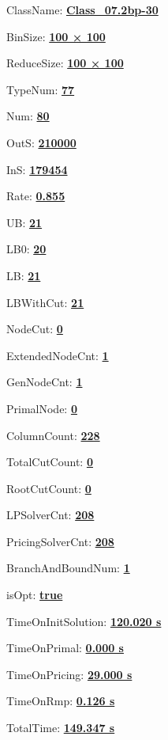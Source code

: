 \documentclass[11pt]{article}
\begin{document}
\pagestyle{empty}


ClassName: \underline{\textbf{Class_07.2bp-30}}
\par
BinSize: \underline{\textbf{100 × 100}}
\par
ReduceSize: \underline{\textbf{100 × 100}}
\par
TypeNum: \underline{\textbf{77}}
\par
Num: \underline{\textbf{80}}
\par
OutS: \underline{\textbf{210000}}
\par
InS: \underline{\textbf{179454}}
\par
Rate: \underline{\textbf{0.855}}
\par
UB: \underline{\textbf{21}}
\par
LB0: \underline{\textbf{20}}
\par
LB: \underline{\textbf{21}}
\par
LBWithCut: \underline{\textbf{21}}
\par
NodeCut: \underline{\textbf{0}}
\par
ExtendedNodeCnt: \underline{\textbf{1}}
\par
GenNodeCnt: \underline{\textbf{1}}
\par
PrimalNode: \underline{\textbf{0}}
\par
ColumnCount: \underline{\textbf{228}}
\par
TotalCutCount: \underline{\textbf{0}}
\par
RootCutCount: \underline{\textbf{0}}
\par
LPSolverCnt: \underline{\textbf{208}}
\par
PricingSolverCnt: \underline{\textbf{208}}
\par
BranchAndBoundNum: \underline{\textbf{1}}
\par
isOpt: \underline{\textbf{true}}
\par
TimeOnInitSolution: \underline{\textbf{120.020 s}}
\par
TimeOnPrimal: \underline{\textbf{0.000 s}}
\par
TimeOnPricing: \underline{\textbf{29.000 s}}
\par
TimeOnRmp: \underline{\textbf{0.126 s}}
\par
TotalTime: \underline{\textbf{149.347 s}}
\par
\newpage


\end{document}
